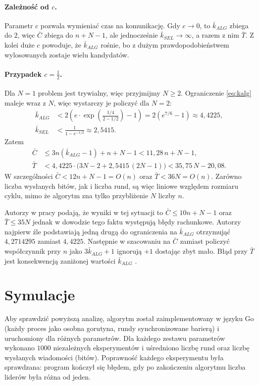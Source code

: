 \documentclass[11pt,a4paper]{article}
\begin{document}
\paragraph{Zależność od $c$.} Parametr $c$ pozwala wymieniać czas na komunikację. Gdy $c \to 0$, to $\bar{k}_{ALG}$ zbiega do $2$, więc $\bar{C}$ zbiega do $n+N-1$,
ale jednocześnie $\bar{k}_{SEL} \to \infty$, a razem z nim $\bar{T}$. Z kolei duże $c$ powoduje, że $\bar{k}_{ALG}$ rośnie, bo z dużym prawdopodobieństwem wylosowanych zostaje wielu kandydatów.

\paragraph{Przypadek $c = \frac{1}{2}$.} Dla $N=1$ problem jest trywialny, więc przyjmijmy $N \geq 2$. Ograniczenie \eqref{eq:kalg} maleje wraz z $N$, więc wystarczy je policzyć dla $N=2$:
\begin{align*}
    \bar{k}_{ALG} &< 2\left(e\cdot\exp\left(\frac{1/4}{2-1/2}\right)-1\right) = 2\left(e^{7/6}-1\right) \approx 4{,}4225, \\
    \bar{k}_{SEL} &< \frac{1}{1-e^{-1/2}} \approx 2{,}5415.
\end{align*}
Zatem
\begin{align*}
    \bar{C} &\leq 3n(\bar{k}_{ALG}-1) + n + N - 1 < 11{,}28\,n + N - 1, \\
    \bar{T} &< 4{,}4225\cdot\bigl(3N-2+2{,}5415\,(2N-1)\bigr) < 35{,}75\,N - 20{,}08.
\end{align*}
W szczególności $\bar{C} < 12n + N - 1 = O(n)$ oraz $\bar{T} < 36N = O(n)$. Zarówno liczba wysłanych bitów, jak i liczba rund, są więc liniowe względem rozmiaru cyklu,
mimo że algorytm zna tylko przybliżenie $N$ liczby $n$.

Autorzy w pracy podają, że wyniki w tej sytuacji to $\bar{C} \leq 10n + N - 1$ oraz $\bar{T} \leq 35N$ jednak w dowodzie tego faktu występują błędy rachunkowe. 
Autorzy najpierw źle podstawiają jedną drugą do ograniczenia na $\bar{k}_{ALG}$ otrzymująć $4{,}2714295$ zamiast $4{,}4225$. 
Następnie w szacowaniu na $\bar{C}$ zamiast policzyć współczynnik przy $n$ jako $3\bar{k}_{ALG} + 1$ ignorują $+1$ dostając zbyt mało.
Błąd przy $\bar{T}$ jest konsekwencją zaniżonej wartości $\bar{k}_{ALG}$ .

\section{Symulacje}

Aby sprawdzić powyższą analizę, algorytm został zaimplementowany w języku Go (każdy proces jako osobna gorutyna, rundy synchronizowane barierą) i uruchomiony dla różnych parametrów. 
Dla każdego zestawu parametrów wykonano $1000$ niezależnych eksperymentów i uśredniono liczbę rund oraz liczbę wysłanych wiadomości (bitów). Poprawność każdego eksperymentu była sprawdzana: 
program kończył się błędem, gdy po zakończeniu algorytmu liczba liderów była różna od jeden. 
\end{document}

